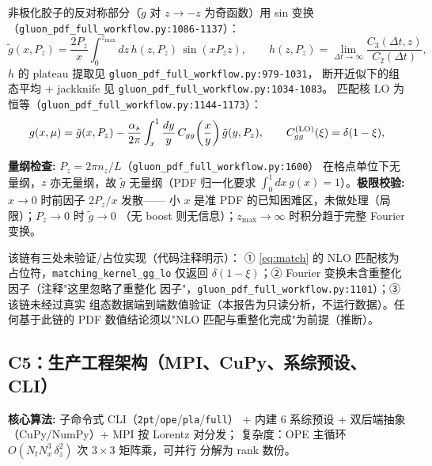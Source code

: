 \documentclass[UTF8]{ctexart}
\begin{document}
非极化胶子的反对称部分（$\tilde g$ 对 $z\to -z$ 为奇函数）用 sin 变换
（\texttt{\nolinkurl{gluon\_pdf\_full\_workflow.py:1086-1137}}）：
\begin{equation}\label{eq:ft}
\tilde g(x,P_z) = \frac{2P_z}{x}\int_0^{z_{\max}} dz\,
h(z,P_z)\,\sin(x P_z z),
\qquad
h(z,P_z) = \lim_{\Delta t\to\infty}
\frac{C_3(\Delta t,z)}{C_2(\Delta t)},
\end{equation}
$h$ 的 plateau 提取见 \texttt{\nolinkurl{gluon\_pdf\_full\_workflow.py:979-1031}}，
断开近似下的组态平均 + jackknife 见 \texttt{\nolinkurl{gluon\_pdf\_full\_workflow.py:1034-1083}}。
匹配核 LO 为恒等（\texttt{\nolinkurl{gluon\_pdf\_full\_workflow.py:1144-1173}}）：
\begin{equation}\label{eq:match}
g(x,\mu) = \tilde g(x,P_z) - \frac{\alpha_s}{2\pi}
\int_x^1 \frac{dy}{y}\, C_{gg}\!\left(\frac{x}{y}\right)\tilde g(y,P_z),
\qquad C_{gg}^{(\rm LO)}(\xi) = \delta(1-\xi),
\end{equation}

\textbf{量纲检查:} $P_z = 2\pi n_z/L$（\texttt{\nolinkurl{gluon\_pdf\_full\_workflow.py:1600}}）
在格点单位下无量纲，$z$ 亦无量纲，故 $\tilde g$ 无量纲（PDF 归一化要求
$\int_0^1 dx\, g(x)=1$）。\textbf{极限校验:} $x\to0$ 时前因子 $2P_z/x$ 发散——
小 $x$ 是准 PDF 的已知困难区，未做处理（局限）；$P_z\to0$ 时 $\tilde g\to0$
（无 boost 则无信息）；$z_{\max}\to\infty$ 时积分趋于完整 Fourier 变换。

\begin{warnbox}
该链有三处\textcolor{warn}{未验证/占位}实现（代码注释明示）：
① \eqref{eq:match} 的 NLO 匹配核为占位符，\texttt{matching\_kernel\_gg\_lo}
仅返回 $\delta(1-\xi)$；② Fourier 变换未含重整化因子（注释"这里忽略了重整化
因子"，\texttt{\nolinkurl{gluon\_pdf\_full\_workflow.py:1101}}）；③ 该链未经过真实
组态数据端到端数值验证（本报告为只读分析，不运行数据）。任何基于此链的
PDF 数值结论须以"NLO 匹配与重整化完成"为前提（推断）。
\end{warnbox}

\subsection{C5：生产工程架构（MPI、CuPy、系综预设、CLI）}

\begin{algobox}
\textbf{核心算法:} 子命令式 CLI（\texttt{2pt}/\texttt{ope}/\texttt{pla}/\texttt{full}）
+ 内建 6 系综预设 + 双后端抽象（CuPy/NumPy）+ MPI 按 Lorentz 对分发；
复杂度：OPE 主循环 $O(N_t N_x^3\, \delta_z^2)$ 次 $3\times3$ 矩阵乘，可并行
分解为 rank 数份。
\end{algobox}
\end{document}
